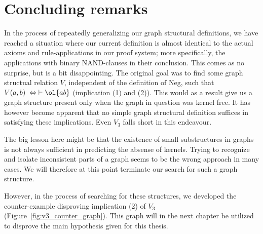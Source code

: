 \section{Concluding remarks}
\label{sec:Concluding remarks}
In the process of repeatedly generalizing our graph structural definitions, we have reached a situation where our current definition is almost identical to the actual axioms and rule-applications in our proof system; more specifically, the applications with binary NAND-clauses in their conclusion.
This comes as no surprise, but is a bit disappointing.
The original goal was to find some graph structual relation $V$, independent of the definition of Neg, such that $V(a,b) \; \Leftrightarrow \; \vdash \ol{ab}$ (implication (1) and (2)).
This would as a result give us a graph structure present only when the graph in question was kernel free.
It has however become apparent that no simple graph structural definition suffices in satisfying these implications.
Even $V_3$ falls short in this endeavour.

The big lesson here might be that the existence of small substructures in graphs is not always sufficient in predicting the absense of kernels.
Trying to recognize and isolate inconsistent parts of a graph seems to be the wrong approach in many cases.
We will therefore at this point terminate our search for such a graph structure.

However, in the process of searching for these structures, we developed the counter-example disproving implication (2) of $V_3$ (Figure~\ref{fig:v3_counter_graph}).
This graph will in the next chapter be utilized to disprove the main hypothesis given for this thesis.
